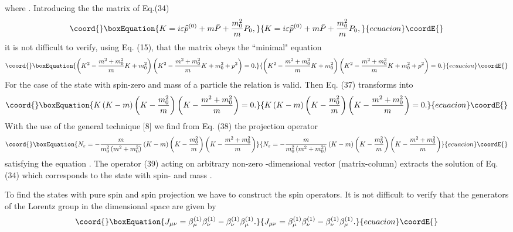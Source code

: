 \documentclass[a4paper,12pt]{article}
\begin{document}
where \coordHE{}. Introducing the
the matrix of Eq.(34)
\begin{equation}\coord{}\boxEquation{
K=i\varepsilon \widehat{p}^{(0)}+ m\bar{P}+\frac{m_0^2}{m}P_0,
\label{36}
}{
K=i\varepsilon \widehat{p}^{(0)}+ m\bar{P}+\frac{m_0^2}{m}P_0,
}{ecuacion}\coordE{}\end{equation}
it is not difficult to verify, using Eq. (15), that the matrix \coordHE{}
obeys the ``minimal" equation
\begin{equation}\coord{}\boxEquation{
\left(K^2-\frac{m^2+m_0^2}{m}K+m_0^2\right)
\left(K^2-\frac{m^2+m_0^2}{m}K+m_0^2+p^2\right)=0. \label{37}
}{
\left(K^2-\frac{m^2+m_0^2}{m}K+m_0^2\right)
\left(K^2-\frac{m^2+m_0^2}{m}K+m_0^2+p^2\right)=0. }{ecuacion}\coordE{}\end{equation}
For the case of the state with spin-zero and mass \coordHE{} of a
particle the relation \coordHE{} is valid. Then Eq. (37)
transforms into
\begin{equation}\coord{}\boxEquation{
K\left(K-m\right)\left(K-\frac{m_0^2}{m}\right)
\left(K-\frac{m^2+m_0^2}{m}\right)=0. \label{38}
}{
K\left(K-m\right)\left(K-\frac{m_0^2}{m}\right)
\left(K-\frac{m^2+m_0^2}{m}\right)=0. }{ecuacion}\coordE{}\end{equation}
With the use of the general technique [8] we find from Eq. (38)
the projection operator
\begin{equation}\coord{}\boxEquation{
N_{\varepsilon}
=-\frac{m}{m_0^2\left(m^2+m_0^2\right)}\left(K-m\right)
\left(K-\frac{m_0^2}{m}\right) \left(K-\frac{m^2+m_0^2}{m}\right)
\label{39}
}{
N_{\varepsilon}
=-\frac{m}{m_0^2\left(m^2+m_0^2\right)}\left(K-m\right)
\left(K-\frac{m_0^2}{m}\right) \left(K-\frac{m^2+m_0^2}{m}\right)
}{ecuacion}\coordE{}\end{equation}
satisfying the equation \coordHE{}. The
operator (39) acting on arbitrary non-zero \coordHE{}-dimensional vector
(matrix-column) extracts the solution of Eq. (34) which
corresponds to the state with spin-\coordHE{} and mass \coordHE{}.

To find the states with pure spin and spin projection we have to
construct the spin operators. It is not difficult to verify that
the generators of the Lorentz group in the \coordHE{}dimensional space
are given by
\begin{equation}\coord{}\boxEquation{
J_{\mu \nu }=\beta _\mu ^{(1)}\beta _\nu ^{(1)}-\beta _\nu
^{(1)}\beta _\mu ^{(1)}.  \label{40}
}{
J_{\mu \nu }=\beta _\mu ^{(1)}\beta _\nu ^{(1)}-\beta _\nu
^{(1)}\beta _\mu ^{(1)}.  }{ecuacion}\coordE{}\end{equation}
\end{document}
